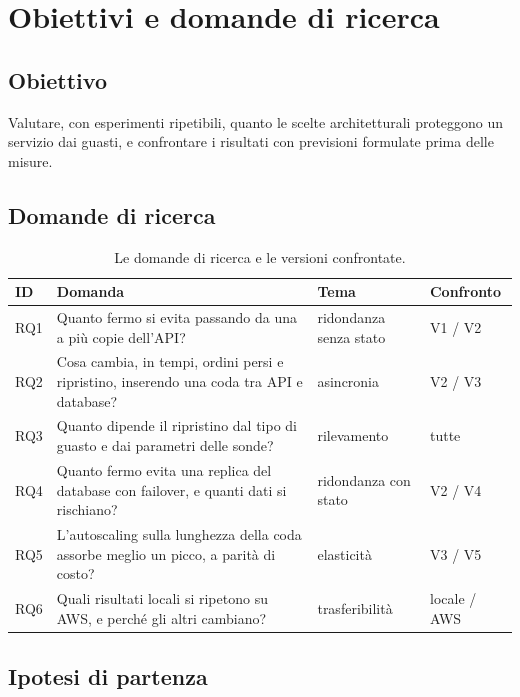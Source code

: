 \chapter{Obiettivi e domande di ricerca}
\label{cap:obiettivi}

\section{Obiettivo}

Valutare, con esperimenti ripetibili, quanto le scelte architetturali proteggono un servizio dai guasti, e confrontare i risultati con previsioni formulate prima delle misure.

\section{Domande di ricerca}

\begin{table}[htbp]
\centering
\caption{Le domande di ricerca e le versioni confrontate.}
\label{tab:rq}
\begin{tabularx}{\linewidth}{@{}lLll@{}}
\toprule
\textbf{ID} & \textbf{Domanda} & \textbf{Tema} & \textbf{Confronto} \\
\midrule
RQ1 & Quanto fermo si evita passando da una a più copie dell'API? & ridondanza senza stato & V1 / V2 \\
RQ2 & Cosa cambia, in tempi, ordini persi e ripristino, inserendo una coda tra API e database? & asincronia & V2 / V3 \\
RQ3 & Quanto dipende il ripristino dal tipo di guasto e dai parametri delle sonde? & rilevamento & tutte \\
RQ4 & Quanto fermo evita una replica del database con failover, e quanti dati si rischiano? & ridondanza con stato & V2 / V4 \\
RQ5 & L'autoscaling sulla lunghezza della coda assorbe meglio un picco, a parità di costo? & elasticità & V3 / V5 \\
RQ6 & Quali risultati locali si ripetono su AWS, e perché gli altri cambiano? & trasferibilità & locale / AWS \\
\bottomrule
\end{tabularx}
\end{table}

\section{Ipotesi di partenza}

